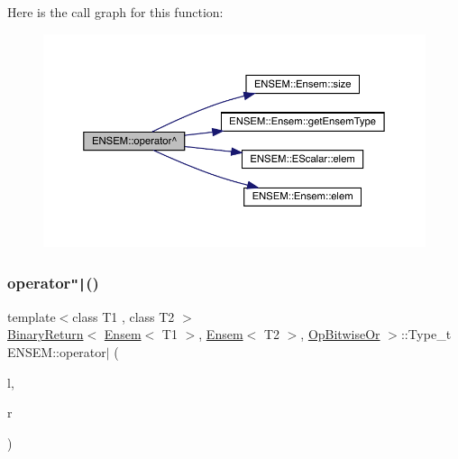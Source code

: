 Here is the call graph for this function\+:\nopagebreak
\begin{figure}[H]
\begin{center}
\leavevmode
\includegraphics[width=350pt]{d1/d9e/group__eensem_gac576149a62d51c7020e2452341351129_cgraph}
\end{center}
\end{figure}
\mbox{\label{group__eensem_ga535dbb02f2bee6036e22a754b7144be1}} 
\subsubsection{\texorpdfstring{operator\texttt{"|}()}{operator|()}\hspace{0.1cm}{\footnotesize\ttfamily [1/3]}}
{\footnotesize\ttfamily template$<$class T1 , class T2 $>$ \\
\mbox{\hyperlink{structENSEM_1_1BinaryReturn}{Binary\+Return}}$<$ \mbox{\hyperlink{classENSEM_1_1Ensem}{Ensem}}$<$ T1 $>$, \mbox{\hyperlink{classENSEM_1_1Ensem}{Ensem}}$<$ T2 $>$, \mbox{\hyperlink{structENSEM_1_1OpBitwiseOr}{Op\+Bitwise\+Or}} $>$\+::Type\+\_\+t E\+N\+S\+E\+M\+::operator$\vert$ (\begin{DoxyParamCaption}\item[{const \mbox{\hyperlink{classENSEM_1_1Ensem}{Ensem}}$<$ T1 $>$ \&}]{l,  }\item[{const \mbox{\hyperlink{classENSEM_1_1Ensem}{Ensem}}$<$ T2 $>$ \&}]{r }\end{DoxyParamCaption})\hspace{0.3cm}{\ttfamily [inline]}}

